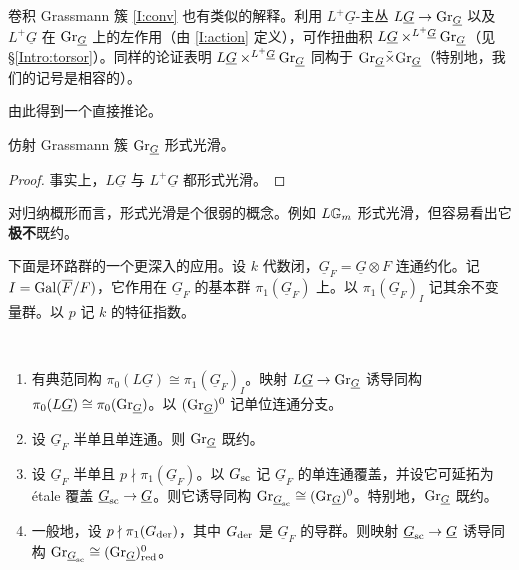 卷积 Grassmann 簇 \eqref{I:conv} 也有类似的解释。利用 $L^+\underline G$-主丛 $L\underline G\to {\operatorname{Gr}}_{\underline G}$ 以及 $L^+\underline G$ 在 ${\operatorname{Gr}}_{\underline G}$ 上的左作用（由 \eqref{I:action} 定义），可作扭曲积 $L\underline G\times^{L^+ \underline G}{\operatorname{Gr}}_{\underline G}$（见 \S\ref{Intro:torsor}）。同样的论证表明 $L\underline G\times^{L^+ \underline G}{\operatorname{Gr}}_{\underline G}$ 同构于 ${\operatorname{Gr}}_{\underline G}\tilde\times{\operatorname{Gr}}_{\underline G}$（特别地，我们的记号是相容的）。

由此得到一个直接推论。

\begin{cor}
仿射 Grassmann 簇 ${\operatorname{Gr}}_{\underline G}$ 形式光滑。
\end{cor}

\begin{proof}
事实上，$L\underline G$ 与 $L^+\underline G$ 都形式光滑。
\end{proof}

\begin{rmk}\label{formal smoothness}
对归纳概形而言，形式光滑是个很弱的概念。例如 $L{\mathbb G}_m$ 形式光滑，但容易看出它\textbf{极不}既约。
\end{rmk}

下面是环路群的一个更深入的应用。设 $k$ 代数闭，$\underline G_F=\underline G\otimes F$ 连通约化。记 $I={\operatorname{Gal}}(\overline F/F)$，它作用在 $\underline G_F$ 的基本群 $\pi_1(\underline G_F)$ 上。以 $\pi_1(\underline G_F)_I$ 记其余不变量群。以 $p$ 记 $k$ 的特征指数。

\begin{thm}\label{components}~
\begin{enumerate}
\item 有典范同构 $\pi_0(L\underline G)\cong \pi_1(\underline G_F)_I$。映射 $L\underline G\to {\operatorname{Gr}}_{\underline G}$ 诱导同构 $\pi_0(L\underline G)\cong \pi_0({\operatorname{Gr}}_{\underline G})$。以 $({\operatorname{Gr}}_{\underline G})^0$ 记单位连通分支。
\item 设 $\underline G_F$ 半单且单连通。则 ${\operatorname{Gr}}_{\underline G}$ 既约。
\item 设 $\underline G_F$ 半单且 $p\nmid \pi_1(\underline G_F)$。以 $G_{\operatorname{sc}}$ 记 $\underline G_F$ 的单连通覆盖，并设它可延拓为 \'etale 覆盖 $\underline G_{\operatorname{sc}}\to \underline G$。则它诱导同构 ${\operatorname{Gr}}_{\underline G_{\operatorname{sc}}}\cong ({\operatorname{Gr}}_{\underline G})^0$。特别地，${\operatorname{Gr}}_{\underline G}$ 既约。
\item 一般地，设 $p\nmid \pi_1(G_{\operatorname{der}})$，其中 $G_{\operatorname{der}}$ 是 $\underline G_F$ 的导群。则映射 $\underline G_{\operatorname{sc}}\to \underline G$ 诱导同构 ${\operatorname{Gr}}_{\underline G_{\operatorname{sc}}}\cong ({\operatorname{Gr}}_{\underline G})^0_{\operatorname{red}}$。
\end{enumerate}
\end{thm}

